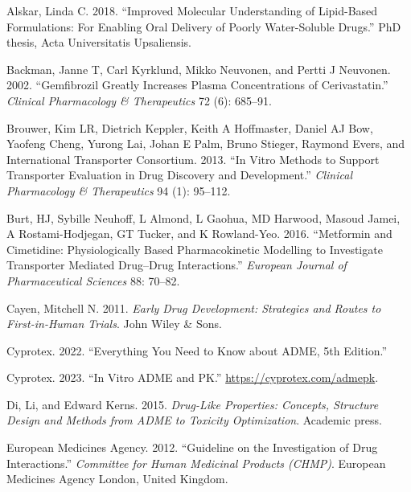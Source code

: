 \documentclass[
  11pt,
  krantz2, a4paper, twoside]{krantz}
\newlength{\cslhangindent}
\newlength{\cslentryspacingunit} %
\newenvironment{CSLReferences}[2] %
 {%
  \setlength{\parindent}{0pt}
  \ifodd #1
  \let\oldpar\par
  \def\par{\hangindent=\cslhangindent\oldpar}
  \fi
  \setlength{\parskip}{#2\cslentryspacingunit}
 }%
 {}
\begin{document}
\hypertarget{refs}{}
\begin{CSLReferences}{1}{0}
\leavevmode{}%
Alskar, Linda C. 2018. {``Improved Molecular Understanding of Lipid-Based Formulations: For Enabling Oral Delivery of Poorly Water-Soluble Drugs.''} PhD thesis, Acta Universitatis Upsaliensis.

\leavevmode{}%
Backman, Janne T, Carl Kyrklund, Mikko Neuvonen, and Pertti J Neuvonen. 2002. {``Gemfibrozil Greatly Increases Plasma Concentrations of Cerivastatin.''} \emph{Clinical Pharmacology \& Therapeutics} 72 (6): 685--91.

\leavevmode{}%
Brouwer, Kim LR, Dietrich Keppler, Keith A Hoffmaster, Daniel AJ Bow, Yaofeng Cheng, Yurong Lai, Johan E Palm, Bruno Stieger, Raymond Evers, and International Transporter Consortium. 2013. {``In Vitro Methods to Support Transporter Evaluation in Drug Discovery and Development.''} \emph{Clinical Pharmacology \& Therapeutics} 94 (1): 95--112.

\leavevmode{}%
Burt, HJ, Sybille Neuhoff, L Almond, L Gaohua, MD Harwood, Masoud Jamei, A Rostami-Hodjegan, GT Tucker, and K Rowland-Yeo. 2016. {``Metformin and Cimetidine: Physiologically Based Pharmacokinetic Modelling to Investigate Transporter Mediated Drug--Drug Interactions.''} \emph{European Journal of Pharmaceutical Sciences} 88: 70--82.

\leavevmode{}%
Cayen, Mitchell N. 2011. \emph{Early Drug Development: Strategies and Routes to First-in-Human Trials}. John Wiley \& Sons.

\leavevmode{}%
Cyprotex. 2022. {``Everything You Need to Know about ADME, 5th Edition.''}

\leavevmode{}%
Cyprotex. 2023. {``In Vitro ADME and PK.''} \url{https://cyprotex.com/admepk}.

\leavevmode{}%
Di, Li, and Edward Kerns. 2015. \emph{Drug-Like Properties: Concepts, Structure Design and Methods from ADME to Toxicity Optimization}. Academic press.

\leavevmode{}%
European Medicines Agency. 2012. {``Guideline on the Investigation of Drug Interactions.''} \emph{Committee for Human Medicinal Products (CHMP)}. European Medicines Agency London, United Kingdom.


\end{CSLReferences}
\end{document}
